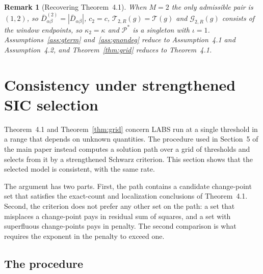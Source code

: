 \documentclass[12pt, a4paper]{article}
\newtheorem{remark}{Remark}[section]
\newcommand{\mainthm}{Theorem~4.1}
\newcommand{\assterm}{Assumption~4.1}
\newcommand{\assnondeg}{Assumption~4.2}
\begin{document}
\begin{remark}[Recovering \mainthm{}]
\label{rem:M2}
When $M = 2$ the only admissible pair is $(1,2)$, so
$\bar D^{(2)}_{\alpha\beta} = |\bar D_{\alpha\beta}|$,
$c_2 = c$, $\mathcal{T}_{2,R}(g) = \mathcal{T}(g)$ and
$\mathcal{G}_{2,R}(g)$ consists of the window endpoints, so $\kappa_2 = \kappa$
and $\mathcal{P}^*$ is a singleton with $\iota = 1$.
Assumptions~\ref{ass:gterm} and~\ref{ass:gnondeg} reduce to \assterm{} and
\assnondeg{}, and Theorem~\ref{thm:grid} reduces to \mainthm{}.
\end{remark}

\section{Consistency under strengthened SIC selection}
\label{sup:ssic}

\mainthm{} and Theorem~\ref{thm:grid} concern LABS run at a single threshold in
a range that depends on unknown quantities. The procedure used in Section~5 of
the main paper instead computes a solution path over a grid of thresholds and
selects from it by a strengthened Schwarz criterion. This section shows that
the selected model is consistent, with the same rate.

The argument has two parts. First, the path contains a candidate change-point
set that satisfies the exact-count and localization conclusions of
\mainthm{}. Second, the criterion does not prefer any other set on the path: a
set that misplaces a change-point pays in residual sum of squares, and a set
with superfluous change-points pays in penalty. The second comparison is what
requires the exponent in the penalty to exceed one.

\subsection{The procedure}
\label{sup:ssicproc}
\end{document}

